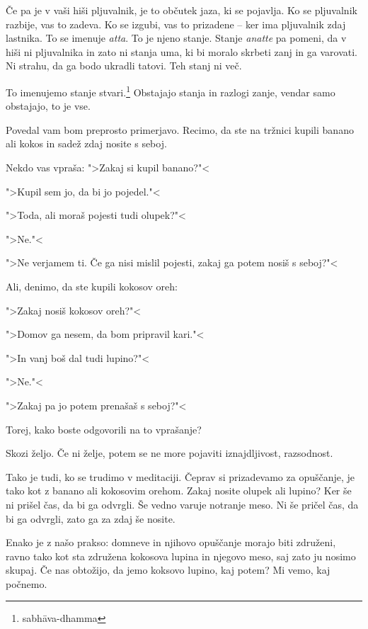 Če pa je v vaši hiši pljuvalnik, je to občutek jaza, ki se pojavlja. Ko se pljuvalnik razbije, vas to zadeva. Ko se izgubi, vas to prizadene – ker ima pljuvalnik zdaj lastnika. To se imenuje \emph{atta}. To je njeno stanje. Stanje \emph{anatte} pa pomeni, da v hiši ni pljuvalnika in zato ni stanja uma, ki bi moralo skrbeti zanj in ga varovati. Ni strahu, da ga bodo ukradli tatovi. Teh stanj ni več.

To imenujemo stanje stvari.\footnote{sabhāva-dhamma} Obstajajo stanja in razlogi zanje, vendar samo obstajajo, to je vse.

\clearpage

\enlargethispage{10cm}


Povedal vam bom preprosto primerjavo. Recimo, da ste na tržnici kupili banano ali kokos in sadež zdaj nosite s seboj.

Nekdo vas vpraša: ">Zakaj si kupil banano?"<

">Kupil sem jo, da bi jo pojedel."<

">Toda, ali moraš pojesti tudi olupek?"<

">Ne."<

">Ne verjamem ti. Če ga nisi mislil pojesti, zakaj ga potem nosiš s seboj?"<

Ali, denimo, da ste kupili kokosov oreh:

">Zakaj nosiš kokosov oreh?"<

">Domov ga nesem, da bom pripravil kari."<

">In vanj boš dal tudi lupino?"<

">Ne."<

">Zakaj pa jo potem prenašaš s seboj?"<

Torej, kako boste odgovorili na to vprašanje?

Skozi željo. Če ni želje, potem se ne more pojaviti iznajdljivost, razsodnost.

Tako je tudi, ko se trudimo v meditaciji. Čeprav si prizadevamo za opuščanje, je tako kot z banano ali kokosovim orehom. Zakaj nosite olupek ali lupino? Ker še ni prišel čas, da bi ga odvrgli. Še vedno varuje notranje meso. Ni še pričel čas, da bi ga odvrgli, zato ga za zdaj še nosite.

Enako je z našo prakso: domneve in njihovo opuščanje morajo biti združeni, ravno tako kot sta združena kokosova lupina in njegovo meso, saj zato ju nosimo skupaj. Če nas obtožijo, da jemo koksovo lupino, kaj potem? Mi vemo, kaj počnemo.

